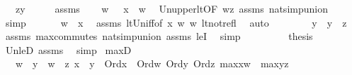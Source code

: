 \begin{isabellebody}
\ \ \ {\isachardoublequoteopen}z{\isasymle}y{\isachardoublequoteclose}\isanewline
%
\isadelimproof
%
\endisadelimproof
%
\isatagproof
{}\isamarkupfalse%
\ {\isacharminus}{\kern0pt}\isanewline
\ \ \isamarkupfalse%
\ assms\isanewline
\ \ \isamarkupfalse%
\ {\isachardoublequoteopen}w\ {\isacharless}{\kern0pt}\ \ x\ {\isasymunion}\ w{\isachardoublequoteclose}\ \isamarkupfalse%
\ Un{\isacharunderscore}{\kern0pt}upper{}{\isacharunderscore}{\kern0pt}lt{\isacharbrackleft}{\kern0pt}OF\ {\isacartoucheopen}w{\isacharless}{\kern0pt}z{\isacartoucheclose}{\isacharbrackright}{\kern0pt}\ assms\ nat{\isacharunderscore}{\kern0pt}simp{\isacharunderscore}{\kern0pt}union\ \isamarkupfalse%
\ simp\isanewline
\ \ \isamarkupfalse%
\isanewline
\ \ \isamarkupfalse%
\ {\isachardoublequoteopen}w\ {\isacharless}{\kern0pt}\ x{\isachardoublequoteclose}\ \isamarkupfalse%
\ assms\ lt{\isacharunderscore}{\kern0pt}Un{\isacharunderscore}{\kern0pt}iff{\isacharbrackleft}{\kern0pt}of\ x\ w\ w{\isacharbrackright}{\kern0pt}\ lt{\isacharunderscore}{\kern0pt}not{\isacharunderscore}{\kern0pt}refl\ \isamarkupfalse%
\ auto\isanewline
\ \ \isamarkupfalse%
\ \isanewline
\ \ \isamarkupfalse%
\ {\isachardoublequoteopen}y\ {\isacharequal}{\kern0pt}\ y\ {\isasymunion}\ z{\isachardoublequoteclose}\ \isamarkupfalse%
\ assms\ max{\isacharunderscore}{\kern0pt}commutes\ nat{\isacharunderscore}{\kern0pt}simp{\isacharunderscore}{\kern0pt}union\ assms\ leI\ \isamarkupfalse%
\ simp\ \isanewline
\ \ \isamarkupfalse%
\ \isanewline
\ \ \isamarkupfalse%
\ {\isacharquery}{\kern0pt}thesis\ \isamarkupfalse%
\ Un{\isacharunderscore}{\kern0pt}leD{}\ assms\ \isamarkupfalse%
\ simp\isanewline
{}\isamarkupfalse%
%
\endisatagproof
{\isafoldproof}%
%
\isadelimproof
\isanewline
%
\endisadelimproof
\isanewline
{}\isamarkupfalse%
\ max{\isacharunderscore}{\kern0pt}D{}\ {\isacharcolon}{\kern0pt}\isanewline
\ \ \ {\isachardoublequoteopen}w\ {\isacharequal}{\kern0pt}\ y\ {\isasymor}\ w\ {\isacharequal}{\kern0pt}\ z{\isachardoublequoteclose}\ {\isachardoublequoteopen}x\ {\isacharless}{\kern0pt}\ y{\isachardoublequoteclose}\ \ {\isachardoublequoteopen}Ord{\isacharparenleft}{\kern0pt}x{\isacharparenright}{\kern0pt}{\isachardoublequoteclose}\ \ {\isachardoublequoteopen}Ord{\isacharparenleft}{\kern0pt}w{\isacharparenright}{\kern0pt}{\isachardoublequoteclose}\ {\isachardoublequoteopen}Ord{\isacharparenleft}{\kern0pt}y{\isacharparenright}{\kern0pt}{\isachardoublequoteclose}\ {\isachardoublequoteopen}Ord{\isacharparenleft}{\kern0pt}z{\isacharparenright}{\kern0pt}{\isachardoublequoteclose}\ {\isachardoublequoteopen}max{\isacharparenleft}{\kern0pt}x{\isacharcomma}{\kern0pt}w{\isacharparenright}{\kern0pt}\ {\isacharequal}{\kern0pt}\ max{\isacharparenleft}{\kern0pt}y{\isacharcomma}{\kern0pt}z{\isacharparenright}{\kern0pt}{\isachardoublequoteclose}\isanewline

\end{isabellebody}
